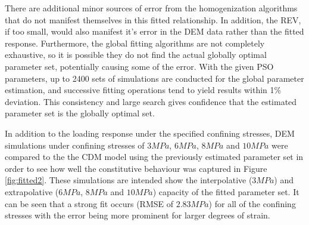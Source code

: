 There are additional minor sources of error from the homogenization algorithms that do not manifest themselves in this fitted relationship.  In addition, the REV, if too small, would also manifest it's error in the DEM data rather than the fitted response. Furthermore, the global fitting algorithms are not completely exhaustive, so it is possible they do not find the actual globally optimal parameter set, potentially causing some of the error. With the given PSO parameters, up to 2400 sets of simulations are conducted for the global parameter estimation, and successive fitting operations tend to yield results within 1\% deviation. This consistency and large search gives confidence that the estimated parameter set is the globally optimal set. 

In addition to the loading response under the specified confining stresses, DEM simulations under confining stresses of $3MPa$, $6MPa$, $8MPa$ and $10MPa$ were compared to the the CDM model using the previously estimated parameter set in order to see how well the constitutive behaviour was captured in Figure \ref{fig:fitted2}. These simulations are intended show the interpolative ($3MPa$) and extrapolative ($6MPa$, $8MPa$ and $10MPa$) capacity of the fitted parameter set. It can be seen that a strong fit occurs (RMSE of $2.83MPa$) for all of the confining stresses with the error being more prominent for larger degrees of strain.